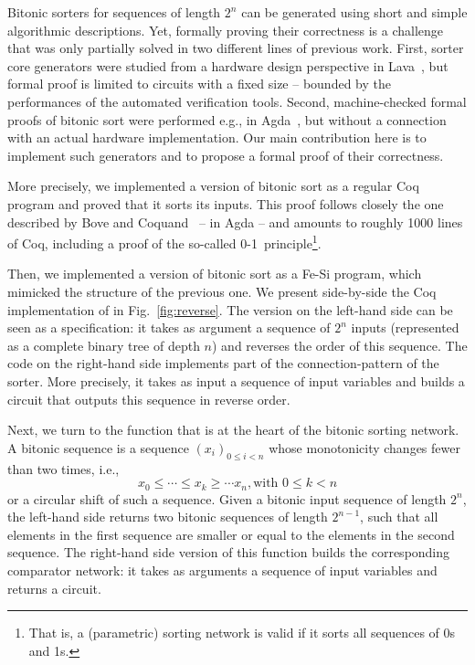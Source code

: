 \documentclass{llncs}
\begin{document}
Bitonic sorters for sequences of length $2^n$ can be generated using
short and simple algorithmic descriptions. Yet, formally proving their
correctness is a challenge that was only partially solved in two
different lines of previous work.
%
First, sorter core generators were studied from a hardware design
perspective in Lava~\cite{DBLP:conf/charme/ClaessenSS01}, but formal
proof is limited to circuits with a fixed size -- bounded by the
performances of the automated verification tools. 
%
Second, machine-checked formal proofs of bitonic sort were performed
e.g., in Agda~\cite{DBLP:conf/types/BoveC04}, but without a
connection with an actual hardware implementation. 
%
Our main contribution here is to implement such generators and to
propose a formal proof of their correctness.

More precisely, we implemented a version of bitonic sort as a regular
Coq program and proved that it sorts its inputs. This proof follows
closely the one described by Bove and
Coquand~\cite{DBLP:conf/types/BoveC04} -- in Agda -- and amounts to
roughly 1000 lines of Coq, including a proof of the so-called
\mbox{0-1~principle}\footnote{That is, a (parametric) sorting network
  is valid if it sorts all sequences of 0s and 1s.}.

Then, we implemented a version of bitonic sort as a Fe-Si program,
which mimicked the structure of the previous one. We present
side-by-side the Coq implementation of  in
Fig.~\ref{fig:reverse}.
%
The version on the left-hand side can be seen as a specification: it
takes as argument a sequence of $2^n$ inputs (represented as a
complete binary tree of depth $n$) and reverses the order of this
sequence.
%
The code on the right-hand side implements part of the
connection-pattern of the sorter. More precisely, it takes as input a
sequence of input variables and builds a circuit that outputs this
sequence in reverse order. 

Next, we turn to the function that is at the heart of the bitonic
sorting network.
%
A bitonic sequence is a sequence $(x_i)_{0 \le i < n}$ whose
monotonicity changes fewer than two times, i.e.,
$$ x_0 \le \cdots \le x_k \ge \cdots x_n, \text{with } 0 \le k < n $$
or a circular shift of such a sequence.
%
Given a bitonic input sequence of length $2^n$, the left-hand side
 returns two bitonic sequences of length $2^{n-1}$,
such that all elements in the first sequence are smaller or equal to
the elements in the second sequence. 
%
The right-hand side version of this function builds the corresponding
comparator network: it takes as arguments a sequence of input
variables and returns a circuit. 
\end{document}
